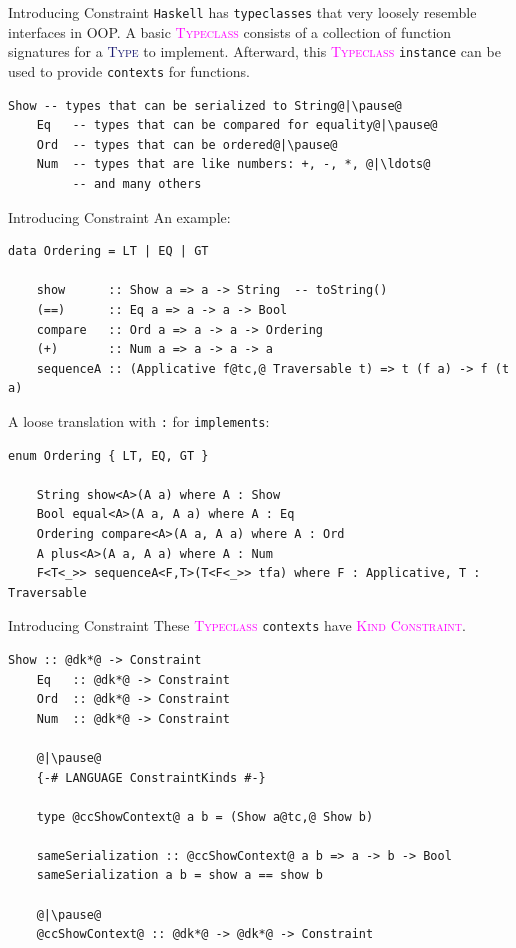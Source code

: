 \documentclass[xcolor={usenames,dvipsnames}]{beamer}
\newcommand{\htycon}[1]{\textcolor{MidnightBlue}{\textsc{#1}}}
\newcommand{\hkind}[1]{\textcolor{Fuchsia}{\textsc{#1}}}
\newcommand{\hclass}[1]{\textcolor{Magenta}{\textsc{#1}}}
\begin{document}
\begin{frame}[fragile]{Introducing Constraint}
  \texttt{Haskell} has \texttt{typeclasses} that very loosely resemble interfaces in OOP. A basic \hclass{Typeclass} consists of a collection of function signatures for a \htycon{Type} to implement. Afterward, this \hclass{Typeclass} \texttt{instance} can be used to provide \texttt{contexts} for functions.
  \pause
  \begin{lstlisting}[style=hask]
    Show -- types that can be serialized to String@|\pause@
    Eq   -- types that can be compared for equality@|\pause@
    Ord  -- types that can be ordered@|\pause@
    Num  -- types that are like numbers: +, -, *, @|\ldots@
         -- and many others
  \end{lstlisting}
\end{frame}

\begin{frame}[fragile]{Introducing Constraint}
  An example:
  \begin{lstlisting}[style=hask]
    data Ordering = LT | EQ | GT

    show      :: Show a => a -> String  -- toString()
    (==)      :: Eq a => a -> a -> Bool
    compare   :: Ord a => a -> a -> Ordering
    (+)       :: Num a => a -> a -> a
    sequenceA :: (Applicative f@tc,@ Traversable t) => t (f a) -> f (t a)
  \end{lstlisting}

  \pause
  A loose translation with \texttt{:} for \texttt{implements}:
  \begin{lstlisting}[style=hask]
    enum Ordering { LT, EQ, GT }

    String show<A>(A a) where A : Show
    Bool equal<A>(A a, A a) where A : Eq
    Ordering compare<A>(A a, A a) where A : Ord
    A plus<A>(A a, A a) where A : Num
    F<T<_>> sequenceA<F,T>(T<F<_>> tfa) where F : Applicative, T : Traversable
  \end{lstlisting}
\end{frame}

\begin{frame}[fragile]{Introducing Constraint}
  These \hclass{Typeclass} \texttt{contexts} have \hkind{Kind} \hkind{Constraint}.
  \begin{lstlisting}[style=hask]
    Show :: @dk*@ -> Constraint
    Eq   :: @dk*@ -> Constraint
    Ord  :: @dk*@ -> Constraint
    Num  :: @dk*@ -> Constraint

    @|\pause@
    {-# LANGUAGE ConstraintKinds #-}

    type @ccShowContext@ a b = (Show a@tc,@ Show b)

    sameSerialization :: @ccShowContext@ a b => a -> b -> Bool
    sameSerialization a b = show a == show b

    @|\pause@
    @ccShowContext@ :: @dk*@ -> @dk*@ -> Constraint
  \end{lstlisting}
\end{frame}
\end{document}
